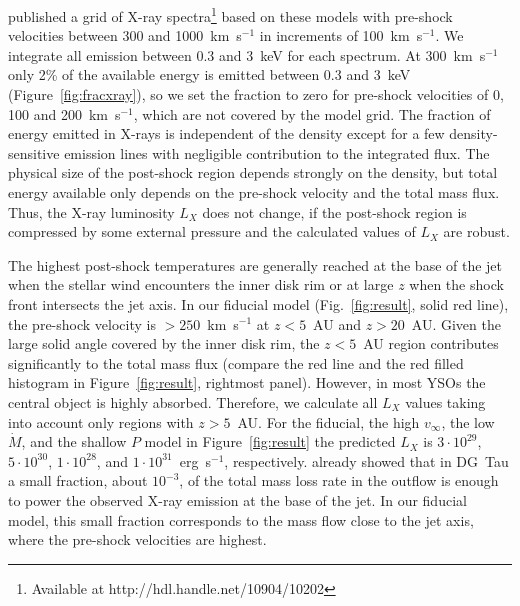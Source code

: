 \documentclass{emulateapj}
\begin{document}
\citet{2011AN....332..448G} published a grid of X-ray spectra\footnote{Available at http://hdl.handle.net/10904/10202} based on these models with pre-shock velocities between 300 and 1000~km~s$^{-1}$ in increments of 100~km~s$^{-1}$. We integrate all emission between 0.3 and 3~keV for each spectrum. At 300~km~s$^{-1}$ only 2\% of the available energy is emitted between 0.3 and 3~keV (Figure~\ref{fig:fracxray}), so we set the fraction to zero for pre-shock velocities of 0, 100 and 200~km~s$^{-1}$, which are not covered by the model grid. The fraction of energy emitted in X-rays is independent of the density except for a few density-sensitive emission lines with negligible contribution to the integrated flux. The physical size of the post-shock region depends strongly on the density, but total energy available only depends on the pre-shock velocity and the total mass flux. Thus, the X-ray luminosity $L_X$ does not change, if the post-shock region is compressed by some external pressure and the calculated values of $L_X$ are robust.

The highest post-shock temperatures are generally reached at the base of the jet when the stellar wind encounters the inner disk rim or at large $z$ when the shock front intersects the jet axis. In our fiducial model (Fig.~\ref{fig:result}, solid red line), the pre-shock velocity is $>250$~km~s$^{-1}$ at $z<5$~AU and $z>20$~AU. Given the large solid angle covered by the inner disk rim, the  $z<5$~AU region contributes significantly to the total mass flux (compare the red line and the red filled histogram in Figure~\ref{fig:result}, rightmost panel). However, in most YSOs the central object is highly absorbed. Therefore, we calculate all $L_X$ values taking into account only regions with  $z>5$~AU. For the fiducial, the high $v_\infty$, the low $\dot M$, and the shallow $P$ model in Figure~\ref{fig:result} the predicted $L_X$ is $3\cdot10^{29}$, $5\cdot10^{30}$, $1\cdot10^{28}$, and $1\cdot10^{31}$~erg~s$^{-1}$, respectively.
\citet{2009A&A...493..579G} already showed that in DG~Tau a small fraction, about $10^{-3}$, of the total mass loss rate in the outflow is enough to power the observed X-ray emission at the base of the jet. In our fiducial model, this small fraction corresponds to the mass flow close to the jet axis, where the pre-shock velocities are highest.
\end{document}
